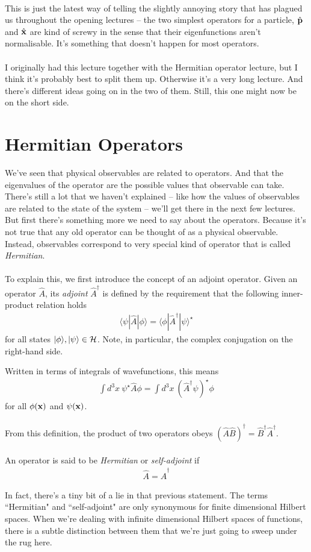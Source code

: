 \documentclass[12pt]{article}
\def\be{\begin{eqnarray}}
\def\ee{\end{eqnarray}}
\newcommand{\nn}{\nonumber}
\newcommand\para{\paragraph{}}
\newcommand{\ket}[1]{|#1\rangle}
\newcommand{\bra}[1]{\langle#1|}
\newcommand{\co}{\color{olive}}
\newcommand{\cred}{\color{red}}
\newcommand{\bx}{{\bf x}}
\newcommand{\bp}{{\bf p}}
\begin{document}
{\para
This is just the latest way of telling the slightly annoying story that has plagued us throughout the opening lectures -- the two simplest operators for a particle, $\hat{\bp}$ and $\hat{\bx}$ are kind of screwy in the sense that their eigenfunctions aren't normalisable. It's something that doesn't happen for most operators. 


\para
{\cred I originally had this lecture together with the Hermitian operator lecture, but I think it's probably best to split them up. Otherwise it's a very long lecture. And there's different ideas going on in the two of them. Still, this one might now be on the short side.}


\newpage
\section{Hermitian Operators}


We've seen that physical observables are related to operators. And that the eigenvalues of the operator are the possible values that observable can take. There's still a lot that we haven't explained -- like how the values of observables are related to the state of the system -- we'll get there in the next few lectures. But first there's something more we need to say about the operators. Because it's not true that any old operator can be thought of as a physical observable. Instead, observables correspond to very special kind of operator that is called {\it Hermitian}. 


\para
To explain this, we first introduce the concept of an adjoint operator. {\co Given an operator $\hat{A}$, its {\it adjoint} $\hat{A}^\dagger$ is defined by the requirement that the following inner-product relation holds
%
\be \bra{\psi}{\hat{A}}\ket{\phi} =   \bra{\phi}\hat{A}^\dagger\ket{\psi}^\star\nn\ee
%
for all states $\ket{\phi},\ket{\psi}\in{\cal H}$. } Note, in particular, the complex conjugation on the right-hand side. {\co Written in terms of integrals of wavefunctions, this means
%
\be \int d^3x\ \psi^\star \hat{A}\phi = \int d^3x\ (\hat{A}^\dagger \psi)^\star \phi\nn \ee
%
for all $\phi(\bx)$ and $\psi(\bx)$. 

\para
From this definition, the product of two operators obeys $(\hat{A}\hat{B})^\dagger = \hat{B}^\dagger \hat{A}^\dagger$.

\para
An operator is said to be {\it Hermitian} or {\it self-adjoint} if
%
\be \hat{A} = \hat{A}^\dagger \nn\ee
%
} In fact, there's a tiny bit of a lie in that previous statement. The terms ``Hermitian" and ``self-adjoint" are only synonymous for finite dimensional Hilbert spaces. When we're dealing with infinite dimensional Hilbert spaces of functions, there is a subtle distinction between them that we're just going to sweep under the rug here.

}
\end{document}

